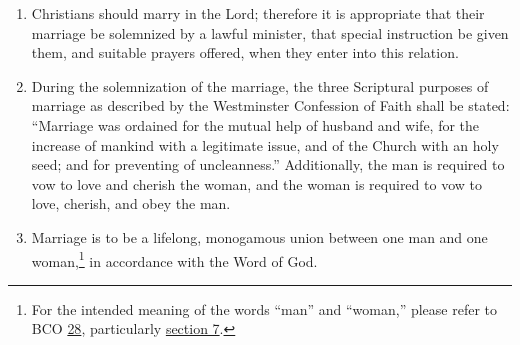\documentclass[
]{book}
\providecommand{\tightlist}{%
  \setlength{\itemsep}{0pt}\setlength{\parskip}{0pt}}
\begin{document}
\begin{enumerate}
\def\labelenumi{\arabic{enumi}.}
\setcounter{enumi}{1}
\tightlist
\item
  Christians should marry in the Lord; therefore it is appropriate that their marriage be solemnized by a lawful minister, that special instruction be given them, and suitable prayers offered, when they enter into this relation.
\item
  \protect\hypertarget{73.3}{\href{}{}}During the solemnization of the marriage, the three Scriptural purposes of marriage as described by the Westminster Confession of Faith shall be stated: ``Marriage was ordained for the mutual help of husband and wife, for the increase of mankind with a legitimate issue, and of the Church with an holy seed; and for preventing of uncleanness.'' Additionally, the man is required to vow to love and cherish the woman, and the woman is required to vow to love, cherish, and obey the man.
\item
  Marriage is to be a lifelong, monogamous union between one man and one woman,\footnote{For the intended meaning of the words ``man'' and ``woman,'' please refer to BCO \protect\hyperlink{28}{28}, particularly \protect\hyperlink{28.7}{section 7}.} in accordance with the Word of God.
\end{enumerate}
\end{document}
